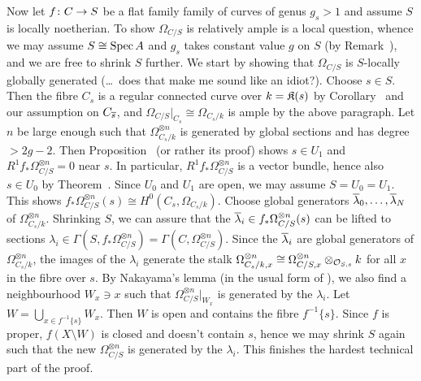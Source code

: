 \documentclass[a4paper,parskip=half,numbers=enddot, DIV=12]{scrreprt}
\begin{document}
\begin{rem}
	Now let $f\colon C\morphism S$ be a flat family family of curves of genus $g_s>1$ and assume $S$ is locally noetherian. To show $\Omega_{C/S}$ is relatively ample is a local question, whence we may assume $S\cong \operatorname{Spec} A$ and $g_s$ takes constant value $g$ on $S$ (by Remark~), and we are free to shrink $S$ further. We start by showing that $\Omega_{C/S}$ is $S$-locally globally generated (\ldots\ does that make me sound like an idiot?). Choose $s\in S$. Then the fibre $C_s$ is a regular connected curve over $k=\mathfrak{K}(s)$ by Corollary~ and our assumption on $C_{\overline{s}}$, and $\Omega_{C/S}|_{C_s}\cong \Omega_{C_s/k}$ is ample by the above paragraph. Let $n$ be large enough such that $\Omega_{C_s/k}^{\otimes n}$ is generated by global sections and has degree $>2g-2$. Then Proposition~ (or rather its proof) shows $s\in U_1$ and $R^1f_*\Omega_{C/S}^{\otimes n}=0$ near $s$. In particular, $R^1f_*\Omega_{C/S}^{\otimes n}$ is a vector bundle, hence also $s\in U_0$ by Theorem~. Since $U_0$ and $U_1$ are open, we may assume $S=U_0=U_1$. This shows $f_*\Omega_{C/S}^{\otimes n}(s)\cong H^0(C_s,\Omega_{C_s/k})$. Choose global generators $\overline{\lambda}_0,\ldots,\overline{\lambda}_N$ of $\Omega_{C_s/k}^{\otimes n}$. Shrinking $S$, we can assure that the $\overline{\lambda}_i\in f_*\Omega_{C/S}^{\otimes n}(s)$ can be lifted to sections $\lambda_i\in \Gamma(S,f_*\Omega_{C/S}^{\otimes n})=\Gamma(C,\Omega_{C/S}^{\otimes n})$. Since the $\overline{\lambda}_i$ are global generators of $\Omega_{C_s/k}^{\otimes n}$, the images of the $\lambda_i$ generate the stalk $\Omega_{C_s/k,x}^{\otimes n}\cong \Omega_{C/S,x}^{\otimes n}\otimes_{\mathcal{O}_{S,s}}k$ for all $x$ in the fibre over $s$. By Nakayama's lemma (in the usual form of \cite[Lemma~1.5.1]{alg2}), we also find a neighbourhood $W_x\ni x$ such that $\Omega_{C/S}^{\otimes n}|_{W_x}$ is generated by the $\lambda_i$. Let $W=\bigcup_{x\in f^{-1}\{s\}}W_x$. Then $W$ is open and contains the fibre $f^{-1}\{s\}$. Since $f$ is proper, $f(X\setminus W)$ is closed and doesn't contain $s$, hence we may shrink $S$ again such that the new $\Omega_{C/S}^{\otimes n}$ is generated by the $\lambda_i$. This finishes the hardest technical part of the proof.
	

\end{rem}
\end{document}
